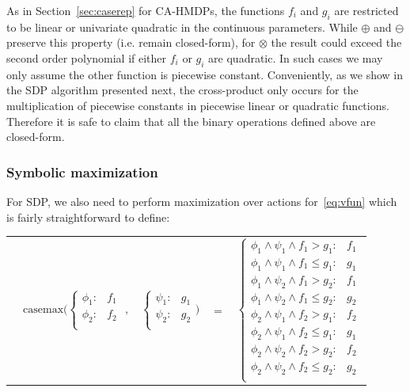 \documentclass[twoside,11pt]{article}
\newcommand{\casemax}{\mathrm{casemax}}
\begin{document}
As in Section~\ref{sec:caserep} for CA-HMDPs, the functions $f_i$ and $g_i$ are restricted to be linear or univariate quadratic in the continuous parameters. While $\oplus$ and $\ominus$ preserve this property (i.e. remain closed-form), for $\otimes$ the result could exceed the second order polynomial if either $f_i$ or $g_i$ are quadratic. In such cases we may only assume the other function is piecewise constant. Conveniently, as we show in the SDP algorithm presented next, the cross-product only occurs for the multiplication of piecewise constants in piecewise linear or quadratic functions. Therefore it is safe to claim that all the binary operations defined above are closed-form.


\subsubsection*{Symbolic maximization}
For SDP, we also need to perform maximization over actions for~\eqref{eq:vfun} which is fairly straightforward
to define:

{%
\begin{center}
\begin{tabular}{r c c c l}
&
\hspace{-9mm} $\casemax \Bigg(
  \begin{cases}
    \phi_1: & f_1 \\ 
    \phi_2: & f_2 \\ 
  \end{cases}$
$,$
&
\hspace{-4mm}
  $\begin{cases}
    \psi_1: & g_1 \\ 
    \psi_2: & g_2 \\ 
  \end{cases} \Bigg)$
&
\hspace{-4mm} 
$ = $
&
\hspace{-4mm}
  $\begin{cases}
  \phi_1 \wedge \psi_1 \wedge f_1 > g_1    : & f_1 \\ 
  \phi_1 \wedge \psi_1 \wedge f_1 \leq g_1 : & g_1 \\ 
  \phi_1 \wedge \psi_2 \wedge f_1 > g_2    : & f_1 \\ 
  \phi_1 \wedge \psi_2 \wedge f_1 \leq g_2 : & g_2 \\ 
  \phi_2 \wedge \psi_1 \wedge f_2 > g_1    : & f_2 \\ 
  \phi_2 \wedge \psi_1 \wedge f_2 \leq g_1 : & g_1 \\ 
  \phi_2 \wedge \psi_2 \wedge f_2 > g_2    : & f_2 \\ 
  \phi_2 \wedge \psi_2 \wedge f_2 \leq g_2 : & g_2 \\ 
  \end{cases}$\label{symbolicMax}
\end{tabular}
\end{center}
}
\end{document}
